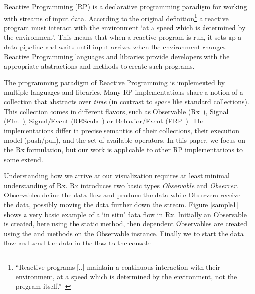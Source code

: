 \label{nutshell}
Reactive Programming (RP) is a declarative programming paradigm for working with streams of input data. 
According to the original definition\footnote{
``Reactive programs [..] maintain a continuous interaction with their environment, at a speed which is determined by the environment, not the program itself.''~\cite{berry1989real}
} a reactive program must interact with the environment `at a speed which is determined by the environment'.
This means that when a reactive program is run, it sets up a data pipeline and waits until input arrives when the environment changes.
Reactive Programming languages and libraries provide developers with the appropriate abstractions and methods to create such programs.

The programming paradigm of Reactive Programming is implemented by multiple languages and libraries. 
Many RP implementations share a notion of a collection that abstracts over \emph{time} (in contrast to \emph{space} like standard collections).
This collection comes in different flavors, 
such as Observable (Rx~\cite{meijer2010subject}), 
Signal (Elm~\cite{czaplicki2012elm}), 
Signal/Event (REScala~\cite{salvaneschi2014rescala}) or 
Behavior/Event (FRP~\cite{elliott1997functional}).
The implementations differ in precise semantics of their collections, their execution model (push/pull), and the set of available operators.  
In this paper, we focus on the Rx formulation, but our work is applicable to other RP implementations to some extend. 

Understanding how we arrive at our visualization requires at least minimal understanding of Rx.
Rx introduces two basic types \emph{Observable} and \emph{Observer}. Observables define the data flow and produce the data while Observers receive the data, possibly moving the data further down the stream. Figure \ref{sample1} shows a very basic example of a `in situ' data flow in Rx. Initially an Observable is created, here using the static  method, then dependent Observables are created using the  and  methods on the Observable instance. Finally we  to start the data flow and send the data in the flow to the console.

